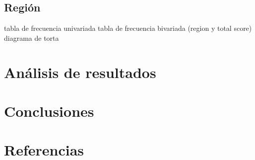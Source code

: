 \documentclass[
]{article}
\begin{document}
\begin{multicols}{2}
\subsection{Región}
tabla de frecuencia univariada
tabla de frecuencia bivariada (region y total score)
diagrama de torta

\section{Análisis de resultados}

\section{Conclusiones}
\section{Referencias}
\end{multicols}
\end{document}
